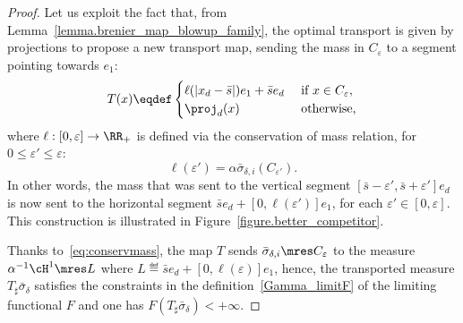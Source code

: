 \begin{proof}
Let us exploit the fact that, from Lemma~\ref{lemma.brenier_map_blowup_family}, the optimal transport is given by projections to propose a new transport map, sending the mass in $C_{\varepsilon}$ to a segment pointing towards $e_1$:
\[
T(x)
\eqdef
\begin{cases}
\ell(|x_d-\bar s|)e_1 + \bar s e_d& \text{ if $x \in C_{\varepsilon}$},\\
\proj_d(x)& \text{ otherwise,}
\end{cases}
\]
where $\ell:[0,\varepsilon] \to \RR_+$ is defined via the conservation of mass relation, for $0\le \varepsilon'\le \varepsilon$:
\begin{equation}\label{eq:conservmass}
\ell(\varepsilon') = \alpha \bar \sigma_{\delta, i}(C_{\varepsilon'}).
\end{equation}
In other words, the mass that was sent to the vertical segment $[\bar s-\varepsilon', \bar s+\varepsilon']e_d$ is now sent to the horizontal segment $\bar s e_d+[0, \ell(\varepsilon')]e_1$,
for each $\varepsilon'\in [0,\varepsilon]$.
This construction is illustrated in Figure~\ref{figure.better_competitor}.

Thanks to~\eqref{eq:conservmass}, the map $T$ sends $\bar \sigma_{\delta, i}\mres C_\varepsilon$ to
the measure $\alpha^{-1}\cH^1\mres L$
where $L\eqdef \bar s e_d+[0,\ell(\varepsilon)]e_1$,
hence, the transported measure $T_\sharp \bar \sigma_{\delta}$ satisfies the constraints in the definition~\eqref{Gamma_limitF} of the limiting functional $F$ and one has $F(T_\sharp \bar \sigma_{\delta})<+\infty$.


\end{proof}
